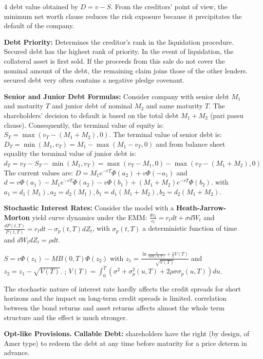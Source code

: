 \documentclass[landscape]{article}
\newcommand{\concept}[1]{\textcolor{conceptcolor}{\textbf{#1}}}
\begin{document}
\begin{multicols}{4}
debt value obtained by $D = v - S$. From the creditors' point of view, the minimum net worth clause reduces the risk exposure because it precipitates the default of the company.

\textcolor{subsubsectioncolor}{\textbf{Debt Priority:}} Determines the creditor's rank in the liquidation procedure.
Secured debt has the highest rank of priority. In the event of liquidation, the collateral asset is first 
sold. If the proceeds from this sale do not cover the nominal amount of the debt, the remaining 
claim joins those of the other lenders. secured debt very often contains a negative pledge covenant.

\concept{Senior and Junior Debt Formulas:} Consider company with senior debt $M_1$ and maturity $T$ and junior debt of nominal $M_2$ and same maturity $T$. The shareholders' decision to default is based on the total debt $M_1 + M_2$ (pari passu clause). Consequently, the terminal value of equity is: $S_T = \max(v_T - (M_1 + M_2), 0)$. The terminal value of senior debt is: $D_T = \min(M_1, v_T) = M_1 - \max(M_1 - v_T, 0)$ and from balance sheet equality the terminal value of junior debt is: $d_T = v_T - S_T - \min(M_1, v_T) = \max(v_T - M_1, 0) - \max(v_T - (M_1 + M_2), 0)$
The current values are: $D = M_1 e^{-rT}\Phi(a_2) + v\Phi(-a_1)$ and $d = v\Phi(a_1) - M_1 e^{-rT}\Phi(a_2) - v\Phi(b_1) + (M_1 + M_2)e^{-rT}\Phi(b_2)$.
with $a_1 = d_1(M_1) , a_2 = d_2(M_1) , b_1 = d_1(M_1 + M_2) , b_2 = d_2(M_1 + M_2)$.

\textcolor{subsubsectioncolor}{\textbf{Stochastic Interest Rates:}} Consider the  model with a \concept{Heath-Jarrow-Morton} yield curve dynamics under the EMM: $\frac{dv_t}{v_t} = r_t dt + \sigma dW_t$ and $\frac{dP(t,T)}{P(t,T)} = r_t dt - \sigma_p(t,T) dZ_t$, with $\sigma_p(t,T)$ a deterministic function of time and $dW_t dZ_t = \rho dt$.

$S = v\Phi(z_1) - MB(0,T)\Phi(z_2)$ with $z_1 = \frac{\ln \frac{v}{MB(0,T)} + \frac{1}{2}V(T)}{\sqrt{V(T)}}$ and $z_2 = z_1 - \sqrt{V(T)}$.
; $V(T) = \int_0^T (\sigma^2 + \sigma_p^2(u,T) + 2\rho\sigma\sigma_p(u,T)) du$.

The stochastic nature of interest rate hardly affects the credit spreads for short horizons and the 
impact on long-term credit spreads is limited.  
correlation between the bond returns and asset returns affects almost the whole term structure 
and the effect is much stronger.

\textcolor{subsectioncolor}{\textbf{Opt-like Provisions.}}
\textcolor{subsubsectioncolor}{\textbf{Callable Debt:}} shareholders have the right (by design, of Amer type) to redeem the debt at any time before maturity for a price determ in advance.


\end{multicols}
\end{document}

